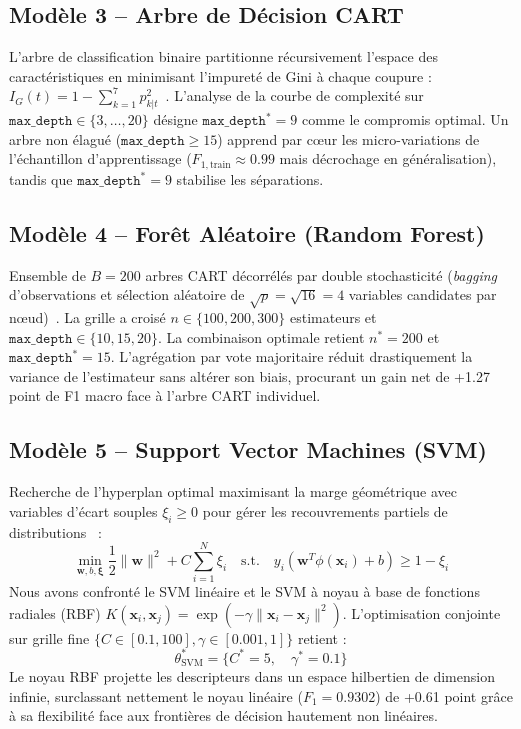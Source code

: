 \documentclass[10pt,a4paper,twocolumn]{article}
\begin{document}
\subsection{Modèle 3 -- Arbre de Décision CART}
L'arbre de classification binaire partitionne récursivement l'espace des caractéristiques en minimisant l'impureté de Gini à chaque coupure : $I_G(t) = 1 - \sum_{k=1}^7 p_{k|t}^2$~\cite{breiman2001random}. L'analyse de la courbe de complexité sur $\texttt{max\_depth} \in \{3, \dots, 20\}$ désigne $\texttt{max\_depth}^* = 9$ comme le compromis optimal. Un arbre non élagué ($\texttt{max\_depth} \ge 15$) apprend par cœur les micro-variations de l'échantillon d'apprentissage ($F_{1,\text{train}} \approx 0.99$ mais décrochage en généralisation), tandis que $\texttt{max\_depth}^* = 9$ stabilise les séparations.

\subsection{Modèle 4 -- Forêt Aléatoire (Random Forest)}
Ensemble de $B = 200$ arbres CART décorrélés par double stochasticité (\textit{bagging} d'observations et sélection aléatoire de $\sqrt{p} = \sqrt{16} = 4$ variables candidates par nœud)~\cite{breiman2001random}. La grille a croisé $n \in \{100, 200, 300\}$ estimateurs et $\texttt{max\_depth} \in \{10, 15, 20\}$. La combinaison optimale retient $n^* = 200$ et $\texttt{max\_depth}^* = 15$. L'agrégation par vote majoritaire réduit drastiquement la variance de l'estimateur sans altérer son biais, procurant un gain net de +1.27 point de F1 macro face à l'arbre CART individuel.

\subsection{Modèle 5 -- Support Vector Machines (SVM)}
Recherche de l'hyperplan optimal maximisant la marge géométrique avec variables d'écart souples $\xi_i \ge 0$ pour gérer les recouvrements partiels de distributions~\cite{cortes1995support} :
\begin{equation}
\min_{\mathbf{w}, b, \boldsymbol{\xi}} \frac{1}{2} \|\mathbf{w}\|^2 + C \sum_{i=1}^N \xi_i \quad \text{s.t.} \quad y_i(\mathbf{w}^T \phi(\mathbf{x}_i) + b) \ge 1 - \xi_i
\label{eq:svm_primal}
\end{equation}
Nous avons confronté le SVM linéaire et le SVM à noyau à base de fonctions radiales (RBF) $K(\mathbf{x}_i, \mathbf{x}_j) = \exp(-\gamma \|\mathbf{x}_i - \mathbf{x}_j\|^2)$. L'optimisation conjointe sur grille fine $\{C \in [0.1, 100], \gamma \in [0.001, 1]\}$ retient :
\begin{equation}
\theta^*_{\text{SVM}} = \{C^* = 5, \quad \gamma^* = 0.1\}
\end{equation}
Le noyau RBF projette les descripteurs dans un espace hilbertien de dimension infinie, surclassant nettement le noyau linéaire ($F_1 = 0.9302$) de +0.61 point grâce à sa flexibilité face aux frontières de décision hautement non linéaires.
\end{document}
